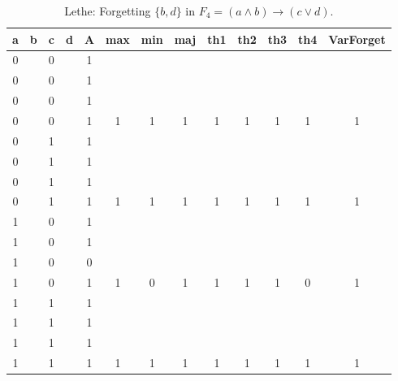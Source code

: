 \begin{table}[!tb]
    \centering
    \begin{tabular}{|c|c|c|c|c|c|c|c|c|c|c|c|c|}
        \hline
        \textbf{a} & \textbf{b} & \textbf{c} & \textbf{d} & \textbf{A} & \textbf{max} & \textbf{min} & \textbf{maj} & \textbf{th1} & \textbf{th2} & \textbf{th3} & \textbf{th4} & \textbf{VarForget} \\ \hline
        \rowcolor{gray!40} 0 &  & 0 &  & 1 &  &  &  &  &  &  &  &  \\ \hline
        \rowcolor{gray!40} 0 &  & 0 &  & 1 &  &  &  &  &  &  &  &  \\ \hline
        \rowcolor{gray!40} 0 &  & 0 &  & 1 &  &  &  &  &  &  &  &  \\ \hline
        \rowcolor{gray!40} 0 &  & 0 &  & 1 & 1 & 1 & 1 & 1 & 1 & 1 & 1 & 1 \\ \hline
        \rowcolor{blue!40} 0 &  & 1 &  & 1 &  &  &  &  &  &  &  &  \\ \hline
        \rowcolor{blue!40} 0 &  & 1 &  & 1 &  &  &  &  &  &  &  &  \\ \hline
        \rowcolor{blue!40} 0 &  & 1 &  & 1 &  &  &  &  &  &  &  &  \\ \hline
        \rowcolor{blue!40} 0 &  & 1 &  & 1 & 1 & 1 & 1 & 1 & 1 & 1 & 1 & 1 \\ \hline
        \rowcolor{red!40} 1 &  & 0 &  & 1 &  &  &  &  &  &  &  &  \\ \hline
        \rowcolor{red!40} 1 &  & 0 &  & 1 &  &  &  &  &  &  &  &  \\ \hline
        \rowcolor{red!40} 1 &  & 0 &  & 0 &  &  &  &  &  &  &  &  \\ \hline
        \rowcolor{red!40} 1 &  & 0 &  & 1 & 1 & 0 & 1 & 1 & 1 & 1 & 0 & 1 \\ \hline
        \rowcolor{green!40} 1 &  & 1 &  & 1 &  &  &  &  &  &  &  &  \\ \hline
        \rowcolor{green!40} 1 &  & 1 &  & 1 &  &  &  &  &  &  &  &  \\ \hline
        \rowcolor{green!40} 1 &  & 1 &  & 1 &  &  &  &  &  &  &  &  \\ \hline
        \rowcolor{green!40} 1 &  & 1 &  & 1 & 1 & 1 & 1 & 1 & 1 & 1 & 1 & 1 \\ \hline
    \end{tabular}
    \caption{Lethe: Forgetting $\{b, d\}$ in $F_{4} = (a \land b) \rightarrow (c \lor d)$.}
    \label{tab:lethe-F4-bd}
\end{table}
